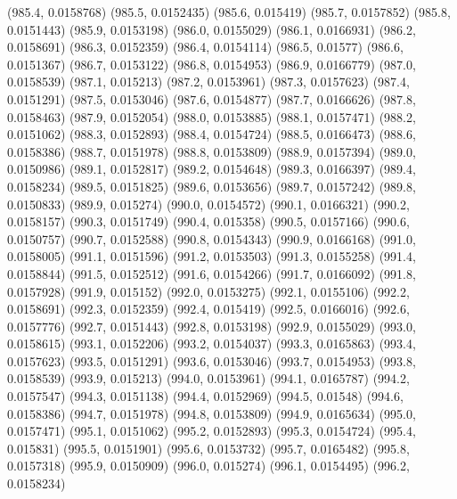 {					(985.4, 0.0158768)
					(985.5, 0.0152435)
					(985.6, 0.015419)
					(985.7, 0.0157852)
					(985.8, 0.0151443)
					(985.9, 0.0153198)
					(986.0, 0.0155029)
					(986.1, 0.0166931)
					(986.2, 0.0158691)
					(986.3, 0.0152359)
					(986.4, 0.0154114)
					(986.5, 0.01577)
					(986.6, 0.0151367)
					(986.7, 0.0153122)
					(986.8, 0.0154953)
					(986.9, 0.0166779)
					(987.0, 0.0158539)
					(987.1, 0.015213)
					(987.2, 0.0153961)
					(987.3, 0.0157623)
					(987.4, 0.0151291)
					(987.5, 0.0153046)
					(987.6, 0.0154877)
					(987.7, 0.0166626)
					(987.8, 0.0158463)
					(987.9, 0.0152054)
					(988.0, 0.0153885)
					(988.1, 0.0157471)
					(988.2, 0.0151062)
					(988.3, 0.0152893)
					(988.4, 0.0154724)
					(988.5, 0.0166473)
					(988.6, 0.0158386)
					(988.7, 0.0151978)
					(988.8, 0.0153809)
					(988.9, 0.0157394)
					(989.0, 0.0150986)
					(989.1, 0.0152817)
					(989.2, 0.0154648)
					(989.3, 0.0166397)
					(989.4, 0.0158234)
					(989.5, 0.0151825)
					(989.6, 0.0153656)
					(989.7, 0.0157242)
					(989.8, 0.0150833)
					(989.9, 0.015274)
					(990.0, 0.0154572)
					(990.1, 0.0166321)
					(990.2, 0.0158157)
					(990.3, 0.0151749)
					(990.4, 0.015358)
					(990.5, 0.0157166)
					(990.6, 0.0150757)
					(990.7, 0.0152588)
					(990.8, 0.0154343)
					(990.9, 0.0166168)
					(991.0, 0.0158005)
					(991.1, 0.0151596)
					(991.2, 0.0153503)
					(991.3, 0.0155258)
					(991.4, 0.0158844)
					(991.5, 0.0152512)
					(991.6, 0.0154266)
					(991.7, 0.0166092)
					(991.8, 0.0157928)
					(991.9, 0.015152)
					(992.0, 0.0153275)
					(992.1, 0.0155106)
					(992.2, 0.0158691)
					(992.3, 0.0152359)
					(992.4, 0.015419)
					(992.5, 0.0166016)
					(992.6, 0.0157776)
					(992.7, 0.0151443)
					(992.8, 0.0153198)
					(992.9, 0.0155029)
					(993.0, 0.0158615)
					(993.1, 0.0152206)
					(993.2, 0.0154037)
					(993.3, 0.0165863)
					(993.4, 0.0157623)
					(993.5, 0.0151291)
					(993.6, 0.0153046)
					(993.7, 0.0154953)
					(993.8, 0.0158539)
					(993.9, 0.015213)
					(994.0, 0.0153961)
					(994.1, 0.0165787)
					(994.2, 0.0157547)
					(994.3, 0.0151138)
					(994.4, 0.0152969)
					(994.5, 0.01548)
					(994.6, 0.0158386)
					(994.7, 0.0151978)
					(994.8, 0.0153809)
					(994.9, 0.0165634)
					(995.0, 0.0157471)
					(995.1, 0.0151062)
					(995.2, 0.0152893)
					(995.3, 0.0154724)
					(995.4, 0.015831)
					(995.5, 0.0151901)
					(995.6, 0.0153732)
					(995.7, 0.0165482)
					(995.8, 0.0157318)
					(995.9, 0.0150909)
					(996.0, 0.015274)
					(996.1, 0.0154495)
					(996.2, 0.0158234)
}
